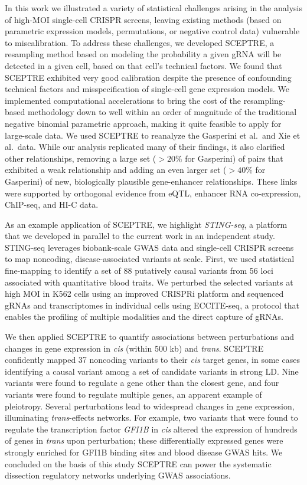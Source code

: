 \documentclass{article}
\begin{document}
In this work we illustrated a variety of statistical challenges arising in the analysis of high-MOI single-cell CRISPR screens, leaving existing methods (based on parametric expression models, permutations, or negative control data) vulnerable to miscalibration. To address these challenges, we developed SCEPTRE, a resampling method based on modeling the probability a given gRNA will be detected in a given cell, based on that cell's technical factors. We found that SCEPTRE exhibited very good calibration despite the presence of confounding technical factors and misspecification of single-cell gene expression models. We implemented computational accelerations to bring the cost of the resampling-based methodology down to well within an order of magnitude of the traditional negative binomial parametric approach, making it quite feasible to apply for large-scale data. We used SCEPTRE to reanalyze the Gasperini et al.\ and Xie et al.\ data.  While our analysis replicated many of their findings, it also clarified other relationships, removing a large set ($>20\%$ for Gasperini) of pairs that exhibited a weak relationship and adding an even larger set ($>40\%$ for Gasperini) of new, biologically plausible gene-enhancer relationships. These links were supported by orthogonal evidence from eQTL, enhancer RNA co-expression, ChIP-seq, and HI-C data.

As an example application of SCEPTRE, we highlight \textit{STING-seq}, a platform that we developed in parallel to the current work in an independent study\cite{Morris2021}. STING-seq leverages biobank-scale GWAS data and single-cell CRISPR screens to map noncoding, disease-associated variants at scale. First, we used statistical fine-mapping to identify a set of 88 putatively causal variants from 56 loci associated with quantitative blood traits. We perturbed the selected variants at high MOI in K562 cells using an improved CRISPRi platform and sequenced gRNAs and transcriptomes in individual cells using ECCITE-seq\cite{Mimitou2019}, a protocol that enables the profiling of multiple modalities and the direct capture of gRNAs.

We then applied SCEPTRE to quantify associations between perturbations and changes in gene expression in \textit{cis} (within 500 kb) and \textit{trans}. SCEPTRE confidently mapped 37 noncoding variants to their \textit{cis} target genes, in some cases identifying a causal variant among a set of candidate variants in strong LD. Nine variants were found to regulate a gene other than the closest gene, and four variants were found to regulate multiple genes, an apparent example of pleiotropy. Several perturbations lead to widespread changes in gene expression, illuminating \textit{trans}-effects networks. For example, two variants that were found to regulate the transcription factor \textit{GFI1B} in \textit{cis} altered the expression of hundreds of genes in \textit{trans} upon perturbation; these differentially expressed genes were strongly enriched for GFI1B binding sites and blood disease GWAS hits. We concluded on the basis of this study SCEPTRE can power the systematic dissection regulatory networks underlying GWAS associations.
\end{document}
